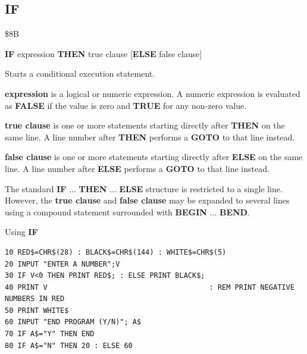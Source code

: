 \subsection{IF}
\begin{description}[leftmargin=2cm,style=nextline]
\item [Token:]    \$8B

\item [Format:]   {\bf IF} expression {\bf THEN} true clause [{\bf ELSE} false clause]

\item [Usage:]    Starts a conditional execution statement.

                  {\bf expression} is a logical or numeric expression. A numeric expression is evaluated as {\bf FALSE} if the value is zero and {\bf TRUE} for any non-zero value.

                  {\bf true clause} is one or more statements starting directly after {\bf THEN} on the same line. A line number after {\bf THEN} performs a {\bf GOTO} to that line instead.

                  {\bf false clause} is one or more statements starting directly after {\bf ELSE} on the same line. A line number after {\bf ELSE} performs a {\bf GOTO} to that line instead.

\item [Remarks:]  The standard {\bf IF} ... {\bf THEN} ... {\bf ELSE} structure is restricted to a single line. However, the {\bf true clause} and {\bf false clause} may be expanded to several lines using a compound statement surrounded with {\bf BEGIN} ... {\bf BEND}.

\item [Example:]  Using {\bf IF}

\begin{tcolorbox}[colback=black,coltext=white]
\verbatimfont{\codefont}
\begin{verbatim}
10 RED$=CHR$(28) : BLACK$=CHR$(144) : WHITE$=CHR$(5)
20 INPUT "ENTER A NUMBER";V
30 IF V<0 THEN PRINT RED$; : ELSE PRINT BLACK$;
40 PRINT V                                      : REM PRINT NEGATIVE NUMBERS IN RED
50 PRINT WHITE$
60 INPUT "END PROGRAM (Y/N)"; A$
70 IF A$="Y" THEN END
80 IF A$="N" THEN 20 : ELSE 60
\end{verbatim}
\end{tcolorbox}
\end{description}



